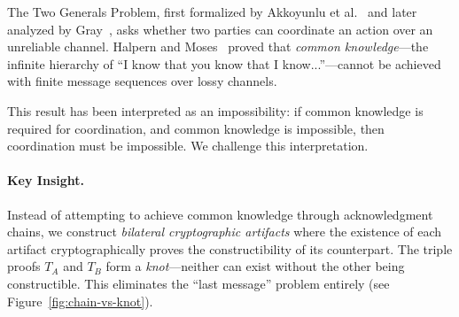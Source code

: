 
The Two Generals Problem, first formalized by Akkoyunlu et al.~\cite{akkoyunlu1975some} and later analyzed by Gray~\cite{gray1978notes}, asks whether two parties can coordinate an action over an unreliable channel. Halpern and Moses~\cite{halpern1990knowledge} proved that \emph{common knowledge}---the infinite hierarchy of ``I know that you know that I know...''---cannot be achieved with finite message sequences over lossy channels.

This result has been interpreted as an impossibility: if common knowledge is required for coordination, and common knowledge is impossible, then coordination must be impossible. We challenge this interpretation.

\paragraph{Key Insight.} Instead of attempting to achieve common knowledge through acknowledgment chains, we construct \emph{bilateral cryptographic artifacts} where the existence of each artifact cryptographically proves the constructibility of its counterpart. The triple proofs $T_A$ and $T_B$ form a \emph{knot}---neither can exist without the other being constructible. This eliminates the ``last message'' problem entirely (see Figure~\ref{fig:chain-vs-knot}).

